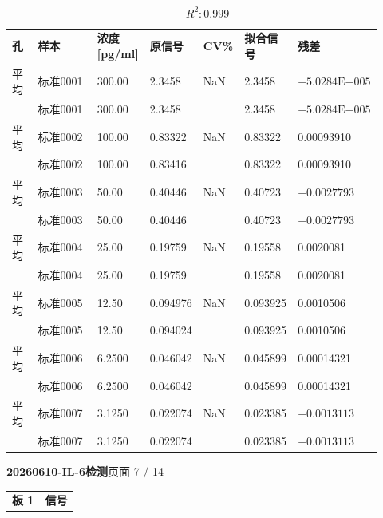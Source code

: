 \documentclass[UTF8,10pt,a4paper,fontset=fandol]{ctexart}
\begin{document}
\[
R^2: 0.999
\]

\begin{center}
\small
\begin{tabular}{p{0.07\linewidth}p{0.16\linewidth}p{0.14\linewidth}p{0.14\linewidth}p{0.10\linewidth}p{0.14\linewidth}p{0.17\linewidth}}
\textbf{孔} & \textbf{样本} & \textbf{浓度 [pg/ml]} & \textbf{原信号} & \textbf{CV\%} & \textbf{拟合信号} & \textbf{残差}\\
平均 & 标准0001 & 300.00 & 2.3458 & NaN & 2.3458 & $-5.0284\mathrm{E}{-005}$\\
 & 标准0001 & 300.00 & 2.3458 &  & 2.3458 & $-5.0284\mathrm{E}{-005}$\\
平均 & 标准0002 & 100.00 & 0.83322 & NaN & 0.83322 & 0.00093910\\
 & 标准0002 & 100.00 & 0.83416 &  & 0.83322 & 0.00093910\\
平均 & 标准0003 & 50.00 & 0.40446 & NaN & 0.40723 & $-0.0027793$\\
 & 标准0003 & 50.00 & 0.40446 &  & 0.40723 & $-0.0027793$\\
平均 & 标准0004 & 25.00 & 0.19759 & NaN & 0.19558 & 0.0020081\\
 & 标准0004 & 25.00 & 0.19759 &  & 0.19558 & 0.0020081\\
平均 & 标准0005 & 12.50 & 0.094976 & NaN & 0.093925 & 0.0010506\\
 & 标准0005 & 12.50 & 0.094024 &  & 0.093925 & 0.0010506\\
平均 & 标准0006 & 6.2500 & 0.046042 & NaN & 0.045899 & 0.00014321\\
 & 标准0006 & 6.2500 & 0.046042 &  & 0.045899 & 0.00014321\\
平均 & 标准0007 & 3.1250 & 0.022074 & NaN & 0.023385 & $-0.0013113$\\
 & 标准0007 & 3.1250 & 0.022074 &  & 0.023385 & $-0.0013113$\\
\end{tabular}
\end{center}

\newpage

\noindent\textbf{20260610-IL-6检测}\hfill 页面 7 / 14

\vspace{0.5em}

\noindent
\begin{tabular}{c|c}
\textbf{板 1} & \textbf{信号}\\
\end{tabular}

\vspace{0.3em}
\end{document}

